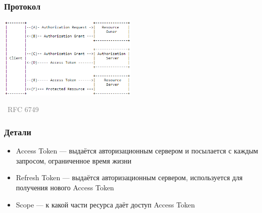 \documentclass[xetex,mathserif,serif]{beamer}
\newcommand{\attribution}[1] {
\vspace{-5mm}\begin{flushright}\begin{scriptsize}\textcolor{gray}{\textcopyright\, #1}\end{scriptsize}\end{flushright}
}
\begin{document}
    \begin{frame}
        \frametitle{Протокол}
        \begin{center}
            \includegraphics[width=0.5\textwidth]{oauth.png}
            \attribution{RFC 6749}
        \end{center}
    \end{frame}

    \begin{frame}
        \frametitle{Детали}
        \begin{itemize}
            \item Access Token --- выдаётся авторизационным сервером и посылается с каждым запросом, ограниченное время жизни
            \item Refresh Token --- выдаётся авторизационным сервером, используется для получения нового Access Token
            \item Scope --- к какой части ресурса даёт доступ Access Token
        \end{itemize}
    \end{frame}
\end{document}
